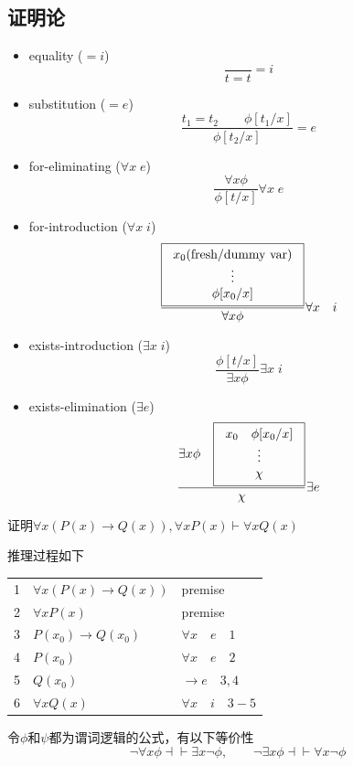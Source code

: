 \subsection{证明论}
\begin{itemize}
	\item equality ($=i$)
	\[\frac{}{t=t}=i\]
	\item substitution ($=e$)
	\[\frac{t_1=t_2\qquad \phi[t_1/x]}{\phi[t_2/x]}=e\]
	\item for-eliminating ($\forall x\; e$)
	\[\frac{\forall x\phi}{\phi[t/x]}\forall x\; e\]
	\item for-introduction ($\forall x\; i$)
	\[\frac{\fbox{\begin{tabular}{c}$x_0$(fresh/dummy var)\\$\vdots$\\$\phi[x_0/x]$\end{tabular}}}{\forall x\phi}\forall x\quad i\]
	\item exists-introduction ($\exists x\; i$)
	\[\frac{\phi[t/x]}{\exists x\phi}\exists x\; i\]
	\item exists-elimination ($\exists e$)
	\[\frac{\exists x\phi\quad \fbox{\begin{tabular}{c}$x_0$\quad $\phi[x_0/x]$\\$\vdots$\\$\chi$\end{tabular}}}{\chi}\exists e\]
\end{itemize}
\begin{example}
证明$\forall x(P(x)\to Q(x)),\forall xP(x)\vdash\forall xQ(x)$
\end{example}
\begin{analysis}
推理过程如下
\begin{center}
\begin{tabular}{lll}
1 & $\forall x(P(x)\to Q(x))$ & premise\\
2 & $\forall xP(x)$ & premise\\
3 & $P(x_0)\to Q(x_0)$ & $\forall x\quad e\quad 1$\\
4 & $P(x_0)$ & $\forall x\quad e\quad 2$\\
5 & $Q(x_0)$ & $\to e\quad 3,4$\\
6 & $\forall xQ(x)$ & $\forall x\quad i\quad 3-5$
\end{tabular}
\end{center}
\end{analysis}
\begin{theorem}
令$\phi$和$\psi$都为谓词逻辑的公式，有以下等价性
\[\lnot\forall x\phi\dashv\vdash\exists x\lnot\phi,\qquad\lnot\exists x\phi\dashv\vdash\forall x\lnot\phi\]
\end{theorem}

